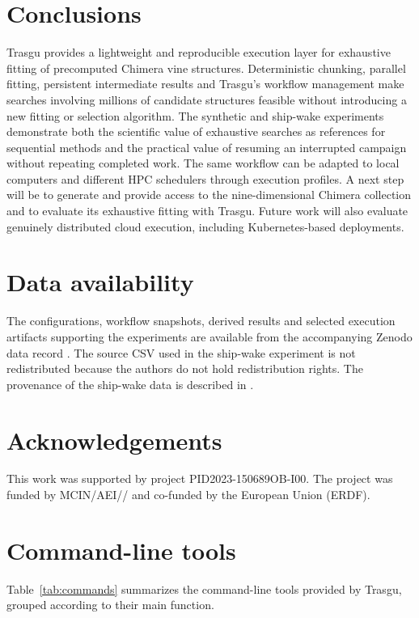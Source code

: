 \documentclass[preprint,12pt, a4paper]{elsarticle}
\begin{document}
\section{Conclusions}
Trasgu provides a lightweight and reproducible execution layer for exhaustive
fitting of precomputed Chimera vine structures. Deterministic chunking,
parallel fitting, persistent intermediate results and Trasgu's workflow
management make searches involving millions of candidate structures feasible
without introducing a new fitting or selection algorithm. The synthetic and
ship-wake experiments demonstrate both the scientific value of exhaustive
searches as references for sequential methods and the practical value of
resuming an interrupted campaign without repeating completed work. The same
workflow can be adapted to local computers and different HPC schedulers through
execution profiles. A next step will be to generate and provide access to the
nine-dimensional Chimera collection and to evaluate its exhaustive fitting
with Trasgu. Future work will also evaluate genuinely distributed cloud
execution, including Kubernetes-based deployments.

\section*{Data availability}

The configurations, workflow snapshots, derived results and selected execution
artifacts supporting the experiments are available from the accompanying
Zenodo data record \citep{TrasguExperiments2026}. The source CSV used in the
ship-wake experiment is not redistributed because the authors do not hold
redistribution rights. The provenance of the ship-wake data is described in
\cite{muscalus}.

\section*{Acknowledgements}

This work was supported by project PID2023-150689OB-I00. The project was funded by MCIN/AEI// and co-funded by the European Union (ERDF).

\appendix

\section{Command-line tools}
\label{app:cli}

Table~\ref{tab:commands} summarizes the command-line tools provided by Trasgu,
grouped according to their main function.
\end{document}
